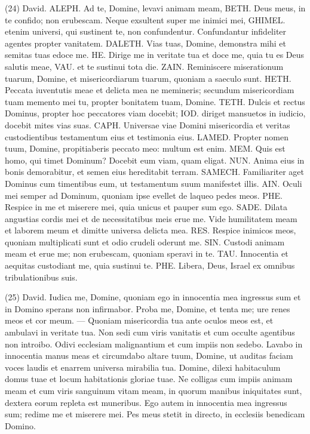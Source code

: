 \begin{biblechapter}  (24) 
\verse David. ALEPH. Ad te, Domine, levavi animam meam, 
\verse BETH. Deus meus, in te confido; non erubescam. Neque exsultent super me inimici mei, 
\verse GHIMEL. etenim universi, qui sustinent te, non confundentur. Confundantur infideliter agentes propter vanitatem. 
\verse DALETH. Vias tuas, Domine, demonstra mihi et semitas tuas edoce me. 
\verse HE. Dirige me in veritate tua et doce me, quia tu es Deus salutis meae, VAU. et te sustinui tota die. 
\verse ZAIN. Reminiscere miserationum tuarum, Domine, et misericordiarum tuarum, quoniam a saeculo sunt. 
\verse HETH. Peccata iuventutis meae et delicta mea ne memineris; secundum misericordiam tuam memento mei tu, propter bonitatem tuam, Domine. 
\verse TETH. Dulcis et rectus Dominus, propter hoc peccatores viam docebit; 
\verse IOD. diriget mansuetos in iudicio, docebit mites vias suas. 
\verse CAPH. Universae viae Domini misericordia et veritas custodientibus testamentum eius et testimonia eius. 
\verse LAMED. Propter nomen tuum, Domine, propitiaberis peccato meo: multum est enim. 
\verse MEM. Quis est homo, qui timet Dominum? Docebit eum viam, quam eligat. 
\verse NUN. Anima eius in bonis demorabitur, et semen eius hereditabit terram. 
\verse SAMECH. Familiariter aget Dominus cum timentibus eum, ut testamentum suum manifestet illis. 
\verse AIN. Oculi mei semper ad Dominum, quoniam ipse evellet de laqueo pedes meos. 
\verse PHE. Respice in me et miserere mei, quia unicus et pauper sum ego. 
\verse SADE. Dilata angustias cordis mei et de necessitatibus meis erue me. 
\verse Vide humilitatem meam et laborem meum et dimitte universa delicta mea. 
\verse RES. Respice inimicos meos, quoniam multiplicati sunt et odio crudeli oderunt me. 
\verse SIN. Custodi animam meam et erue me; non erubescam, quoniam speravi in te. 
\verse TAU. Innocentia et aequitas custodiant me, quia sustinui te. 
\verse PHE. Libera, Deus, Israel ex omnibus tribulationibus suis. 
\end{biblechapter}

\begin{biblechapter}  (25) 
\verse David. Iudica me, Domine, quoniam ego in innocentia mea ingressus sum et in Domino sperans non infirmabor. 
\verse Proba me, Domine, et tenta me; ure renes meos et cor meum. — 
\verse Quoniam misericordia tua ante oculos meos est, et ambulavi in veritate tua. 
\verse Non sedi cum viris vanitatis et cum occulte agentibus non introibo. 
\verse Odivi ecclesiam malignantium et cum impiis non sedebo. 
\verse Lavabo in innocentia manus meas et circumdabo altare tuum, Domine, 
\verse ut auditas faciam voces laudis et enarrem universa mirabilia tua. 
\verse Domine, dilexi habitaculum domus tuae et locum habitationis gloriae tuae. 
\verse Ne colligas cum impiis animam meam et cum viris sanguinum vitam meam, 
\verse in quorum manibus iniquitates sunt, dextera eorum repleta est muneribus. 
\verse Ego autem in innocentia mea ingressus sum; redime me et miserere mei. 
\verse Pes meus stetit in directo, in ecclesiis benedicam Domino. 
\end{biblechapter}

